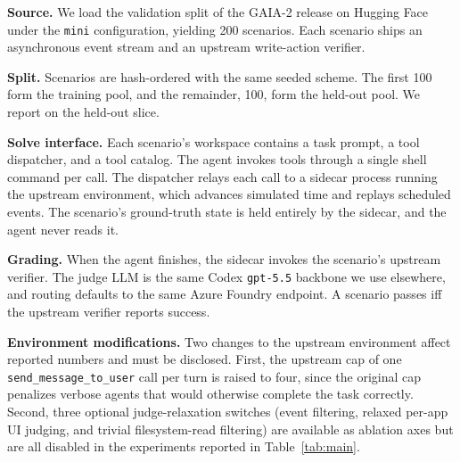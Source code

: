 \noindent\textbf{Source.}
We load the validation split of the GAIA-2 release on Hugging Face under the \texttt{mini} configuration, yielding 200 scenarios.
Each scenario ships an asynchronous event stream and an upstream write-action verifier.

\noindent\textbf{Split.}
Scenarios are hash-ordered with the same seeded scheme.
The first 100 form the training pool, and the remainder, 100, form the held-out pool.
We report on the held-out slice.

\noindent\textbf{Solve interface.}
Each scenario's workspace contains a task prompt, a tool dispatcher, and a tool catalog.
The agent invokes tools through a single shell command per call.
The dispatcher relays each call to a sidecar process running the upstream environment, which advances simulated time and replays scheduled events.
The scenario's ground-truth state is held entirely by the sidecar, and the agent never reads it.

\noindent\textbf{Grading.}
When the agent finishes, the sidecar invokes the scenario's upstream verifier.
The judge LLM is the same Codex \texttt{gpt-5.5} backbone we use elsewhere, and routing defaults to the same Azure Foundry endpoint.
A scenario passes iff the upstream verifier reports success.

\noindent\textbf{Environment modifications.}
Two changes to the upstream environment affect reported numbers and must be disclosed.
First, the upstream cap of one \texttt{send\_message\_to\_user} call per turn is raised to four, since the original cap penalizes verbose agents that would otherwise complete the task correctly.
Second, three optional judge-relaxation switches (event filtering, relaxed per-app UI judging, and trivial filesystem-read filtering) are available as ablation axes but are all disabled in the experiments reported in Table~\ref{tab:main}.
